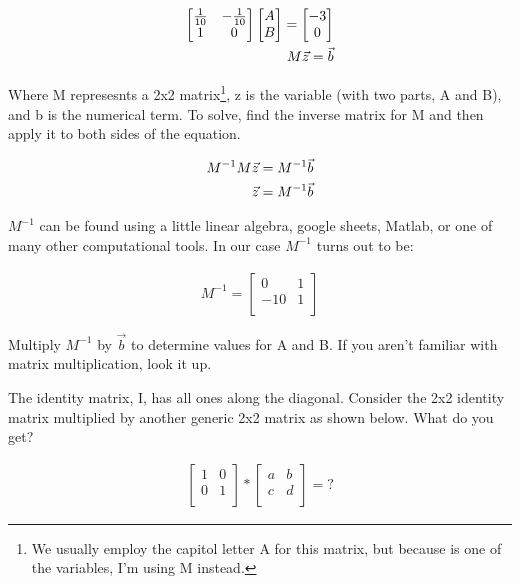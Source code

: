 \begin{align}
\left[ \begin{matrix}
\frac{1}{10} &	-\frac{1}{10}\\
1		&	0 \\
\end{matrix} \right]
\left[ \begin{matrix}
A\\
B\\
\end{matrix} \right]
=
\left[ \begin{matrix}
-3\\
0\\
\end{matrix} \right] \notag \\
M\vec{z}=\vec{b}
\end{align} 

Where M represesnts a 2x2 matrix\footnote{We usually employ the capitol letter A for this matrix, but because is one of the variables, I'm using M instead.}, z is the variable (with two parts, A and B), and b is the numerical term. To solve, find the inverse matrix for M and then apply it to both sides of the equation.

\begin{align}
M^{-1}M\vec{z}=M^{-1}\vec{b} \notag\\
\vec{z} = M^{-1}\vec{b}
\end{align} 

$M^{-1}$ can be found using a little linear algebra, google sheets, Matlab, or one of many other computational tools. In our case $M^{-1}$ turns out to be:


\begin{align*}
M^{-1}=\left[ \begin{matrix}
0 &	1\\
-10		&	1 \\
\end{matrix} \right]
\end{align*} 

\begin{blevel}
Multiply $M^{-1}$ by $\vec{b}$ to determine values for A and B. If you aren't familiar with matrix multiplication, look it up.
\end{blevel}

\begin{blevel}
The identity matrix, I, has all ones along the diagonal. Consider the 2x2 identity matrix multiplied by another generic 2x2 matrix as shown below. What do you get?

\begin{align*}
\left[ \begin{matrix}
1 &	0\\
0&	1 \\
\end{matrix} \right]*\left[ \begin{matrix}
a &	b\\
c&	d \\
\end{matrix} \right]=?
\end{align*} 
\end{blevel}


